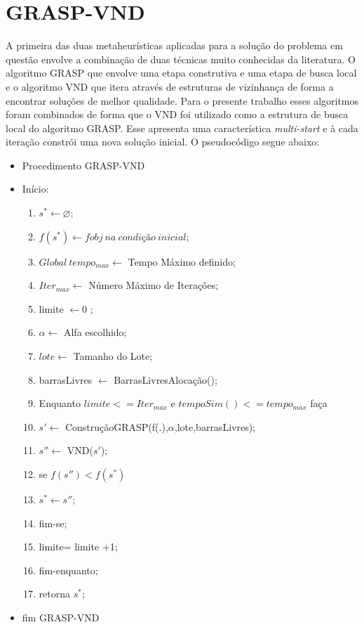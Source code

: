 \documentclass[12pt]{article}
\begin{document}
\section{GRASP-VND}

A primeira das duas metaheurísticas aplicadas para a solução do problema em questão envolve a combinação de duas técnicas muito conhecidas da literatura. O  algoritmo GRASP \cite{GRASP95} que envolve uma etapa construtiva e uma etapa de busca local e o algoritmo VND \cite{VND97} que itera através de estruturas de vizinhança de forma a encontrar soluções de melhor qualidade. Para o presente trabalho esses algoritmos foram combinados de forma que o VND foi utilizado como a estrutura de busca local do algoritmo GRASP. Esse apresenta uma característica \textit{multi-start} e à cada iteração constrói uma nova solução inicial. O pseudocódigo segue abaixo:
\begin{itemize}
	\item Procedimento GRASP-VND
	\item Início:
	\begin{enumerate}
		\item $s^* \leftarrow \varnothing$; 
		\item $f(s^*) \leftarrow fobj~na~condição~inicial$;
		\item $Global~tempo_{max} \leftarrow$ Tempo Máximo definido;
		\item $Iter_{max} \leftarrow$ Número Máximo de Iterações;
		\item limite $\leftarrow 0$ ;
		\item $\alpha \leftarrow$ Alfa escolhido;
		\item $lote \leftarrow$ Tamanho do Lote;
		\item barrasLivres $\leftarrow$ BarrasLivresAlocação();
		\item Enquanto $limite <= Iter_{max}$ e $tempoSim() <= tempo_{max}$ faça
		\item \quad $s' \leftarrow$ ConstruçãoGRASP(f(.),$\alpha$,lote,barrasLivres);
		\item \quad $s'' \leftarrow$ VND($s'$); 
		\item \quad se $f(s'') < f(s^*)$
		\item \qquad  $s^* \leftarrow s''$;
		\item \quad fim-se;
		\item \quad limite= limite +1;
		\item fim-enquanto;
		\item retorna $s^*$;
	\end{enumerate}	
	\item fim GRASP-VND
\end{itemize}
\end{document}

